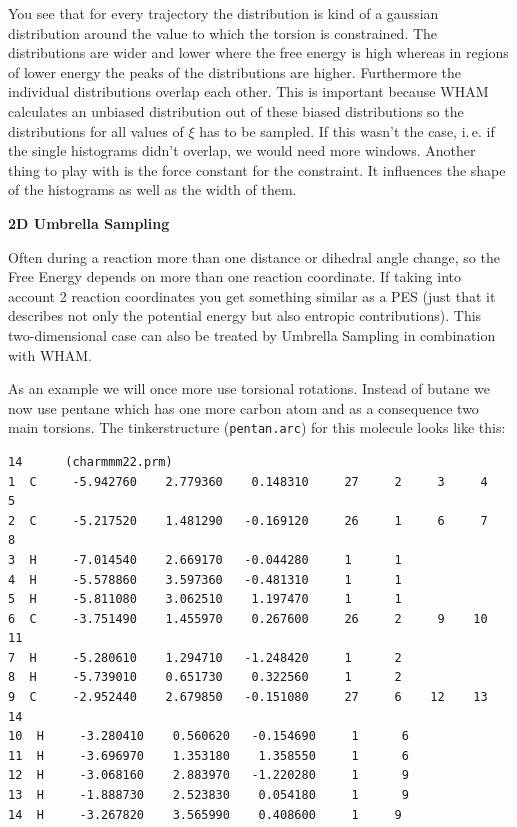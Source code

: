 \documentclass[a4paper,11pt]{scrartcl}
\begin{document}
You see that for every trajectory the distribution is kind of a gaussian distribution around the value to which the torsion is constrained. The distributions are wider and lower where the free energy is high whereas in regions of lower energy the peaks of the distributions are higher. Furthermore the individual distributions overlap each other. This is important because WHAM calculates an unbiased distribution out of these biased distributions so the distributions for all values of $\xi$ has to be sampled. If this wasn't the case, i.\,e. if the single histograms didn't overlap, we would need more windows. Another thing to play with is the force constant for the constraint. It influences the shape of the histograms as well as the width of them.\supercite{mills_experimentally_2008}

\FloatBarrier



\FloatBarrier

\textbf{2D Umbrella Sampling}

Often during a reaction more than one distance or dihedral angle change, so the Free Energy depends on more than one reaction coordinate. If taking into account 2 reaction coordinates you get something similar as a PES (just that it describes not only the potential energy but also entropic contributions). This two-dimensional case can also be treated by Umbrella Sampling in combination with WHAM.

As an example we will once more use torsional rotations. Instead of butane we now use pentane which has one more carbon atom and as a consequence two main torsions. The tinkerstructure (\texttt{pentan.arc}) for this molecule looks like this:
\begin{lstlisting}[frame=single,]
14      (charmmm22.prm)
1  C     -5.942760    2.779360    0.148310     27     2     3     4     5
2  C     -5.217520    1.481290   -0.169120     26     1     6     7     8
3  H     -7.014540    2.669170   -0.044280     1      1
4  H     -5.578860    3.597360   -0.481310     1      1
5  H     -5.811080    3.062510    1.197470     1      1
6  C     -3.751490    1.455970    0.267600     26     2     9    10    11
7  H     -5.280610    1.294710   -1.248420     1      2
8  H     -5.739010    0.651730    0.322560     1      2
9  C     -2.952440    2.679850   -0.151080     27     6    12    13    14
10  H     -3.280410    0.560620   -0.154690     1      6
11  H     -3.696970    1.353180    1.358550     1      6
12  H     -3.068160    2.883970   -1.220280     1      9
13  H     -1.888730    2.523830    0.054180     1      9
14  H     -3.267820    3.565990    0.408600     1     9
\end{lstlisting}
\end{document}
